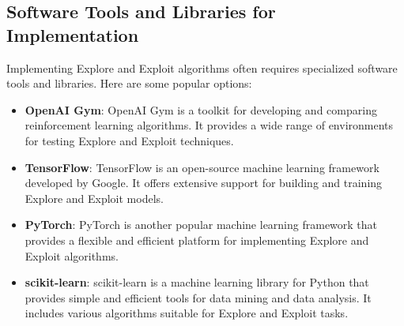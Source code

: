 \documentclass[12pt]{book} %
\begin{document}
\subsection{Software Tools and Libraries for Implementation}
Implementing Explore and Exploit algorithms often requires specialized software tools and libraries. Here are some popular options:

\begin{itemize}
    \item \textbf{OpenAI Gym}: OpenAI Gym is a toolkit for developing and comparing reinforcement learning algorithms. It provides a wide range of environments for testing Explore and Exploit techniques.
    
    \item \textbf{TensorFlow}: TensorFlow is an open-source machine learning framework developed by Google. It offers extensive support for building and training Explore and Exploit models.
    
    \item \textbf{PyTorch}: PyTorch is another popular machine learning framework that provides a flexible and efficient platform for implementing Explore and Exploit algorithms.
    
    \item \textbf{scikit-learn}: scikit-learn is a machine learning library for Python that provides simple and efficient tools for data mining and data analysis. It includes various algorithms suitable for Explore and Exploit tasks.
\end{itemize}
\end{document}
